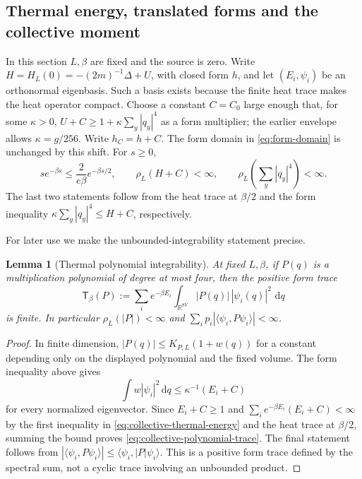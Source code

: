 \documentclass[11pt]{article}
\numberwithin{equation}{section}
\newtheorem{lemma}[theorem]{Lemma}
\theoremstyle{definition}
\newcommand{\dd}{\,\mathrm d}
\begin{document}
\subsection{Thermal energy, translated forms and the collective moment}

In this section $L,\beta$ are fixed and the source is zero.  Write
$H=H_L(0)=-(2m)^{-1}\Delta+U$, with closed form $h$, and let
$(E_i,\psi_i)$ be an orthonormal eigenbasis.  Such a basis exists because
the finite heat trace makes the heat operator compact.  Choose a constant $C=C_0$ large enough that, for some $\kappa>0$,
$U+C\geq1+\kappa\sum_y|q_y|^4$ as a form multiplier; the earlier envelope
allows $\kappa=g/256$.  Write $h_C=h+C$.  The form domain in
\eqref{eq:form-domain} is unchanged by this shift.  For $s\geq0$,
\begin{equation}
 s e^{-\beta s}\leq\frac{2}{e\beta}e^{-\beta s/2},\qquad
 \rho_L(H+C)<\infty,\qquad
 \rho_L\left(\sum_y|q_y|^4\right)<\infty.
 \label{eq:collective-thermal-energy}
\end{equation}
The last two statements follow from the heat trace at $\beta/2$ and the
form inequality $\kappa\sum_y|q_y|^4\leq H+C$, respectively.

For later use we make the unbounded-integrability statement precise.
\begin{lemma}[Thermal polynomial integrability]
\label{lem:collective-polynomial-integrability}
At fixed $L,\beta$, if $P(q)$ is a multiplication polynomial of degree at most
four, then the positive form trace
\begin{equation}
 {\mathsf T}_{\beta}(P):=\sum_i e^{-\beta E_i}
       \int_{\mathbb R^{8V}}|P(q)|\,|\psi_i(q)|^2\,\dd q
 \label{eq:collective-polynomial-trace}
\end{equation}
 is finite.  In particular $\rho_L(|P|)<\infty$ and
 $\sum_i p_i|\langle\psi_i,P\psi_i\rangle|<\infty$.
\end{lemma}
\begin{proof}
In finite dimension, $|P(q)|\leq K_{P,L}(1+w(q))$ for a constant depending
only on the displayed polynomial and the fixed volume.  The form inequality
above gives
\[
 \int w|\psi_i|^2\dd q\leq\kappa^{-1}(E_i+C)
\]
for every normalized eigenvector.  Since $E_i+C\geq1$ and
$\sum_i e^{-\beta E_i}(E_i+C)<\infty$ by the first inequality in
\eqref{eq:collective-thermal-energy} and the heat trace at $\beta/2$,
summing the bound proves \eqref{eq:collective-polynomial-trace}.  The final
statement follows from $|\langle\psi_i,P\psi_i\rangle|\leq\langle\psi_i,|P|\psi_i\rangle$.  This is a positive form trace defined by the
spectral sum, not a cyclic trace involving an unbounded product.
\end{proof}
\end{document}
